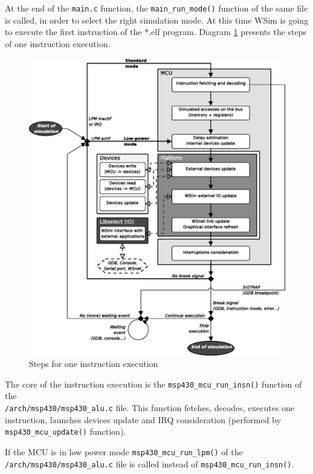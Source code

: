 \documentclass[a4paper,10pt]{report}
\begin{document}
At the end of the \verb$main.c$ function, the \verb$main_run_mode()$
function of the same file is called, in order to select the right
simulation mode. At this time WSim is going to execute the first
instruction of the *.elf program. Diagram \ref{wsim-instruction}
presents the steps of one instruction execution.

\begin{figure}[ht]
\begin{center}
  \includegraphics[scale=0.8]{figures/wsim_diag_execution.eps}
\end{center}
\caption{Steps for one instruction execution}
\label{wsim-instruction}
\end{figure}

The core of the instruction execution is the
\verb$msp430_mcu_run_insn()$ function of the\\
\verb$/arch/msp430/msp430_alu.c$ file. This function fetches, decodes,
executes one instruction, launches devices update and IRQ
consideration (performed by \verb$msp430_mcu_update()$ function).

If the MCU is in low power mode \verb$msp430_mcu_run_lpm()$ of 
the \verb$/arch/msp430/msp430_alu.c$ file is called instead of 
\verb$msp430_mcu_run_insn()$.\\
\end{document}

